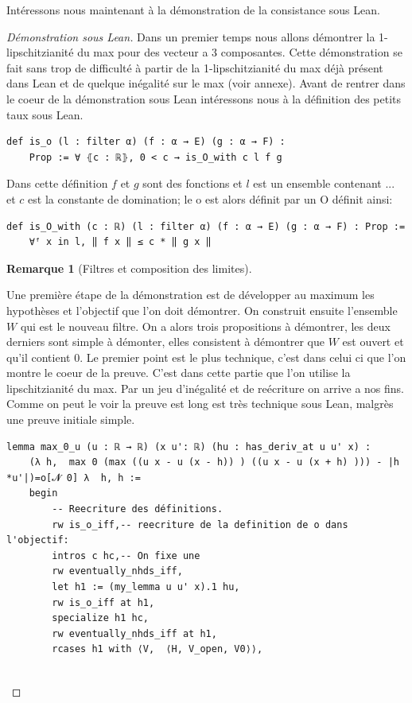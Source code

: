 \documentclass[12pt]{article}
\newtheorem{remark}[theorem]{Remarque}
\numberwithin{equation}{section}
\begin{document}
Intéressons nous maintenant à la démonstration de la consistance sous Lean.
\begin{proof}[Démonstration sous Lean]

Dans un premier temps nous allons démontrer la 1-lipschitzianité du max pour des vecteur a 3 composantes.
Cette démonstration se fait sans trop de difficulté à partir de la 1-lipschitzianité du max déjà présent dans Lean et de quelque inégalité sur le max (voir annexe).
Avant de rentrer dans le coeur de la démonstration sous Lean intéressons nous à la définition des petits taux sous Lean.
\begin{lstlisting}[gobble=2]
    def is_o (l : filter α) (f : α → E) (g : α → F) :
    Prop := ∀ ⦃c : ℝ⦄, 0 < c → is_O_with c l f g
\end{lstlisting}
Dans cette définition $f$ et $g$ sont des fonctions et $l$ est un ensemble contenant ... et $c$ est la constante de domination; le o est alors définit par un O définit ainsi:
\begin{lstlisting}[gobble=2]
    def is_O_with (c : ℝ) (l : filter α) (f : α → E) (g : α → F) : Prop :=
    ∀ᶠ x in l, ‖ f x ‖ ≤ c * ‖ g x ‖
\end{lstlisting}

\begin{remark}[Filtres et composition des limites]

\end{remark}

Une première étape de la démonstration est de développer au maximum les hypothèses et l'objectif que l'on doit démontrer.
On construit ensuite l'ensemble $W$ qui est le nouveau filtre. On a alors trois propositions à démontrer, les deux derniers sont simple à démonter, elles consistent à démontrer que $W$ est ouvert et qu'il contient $0$.
Le premier point est le plus technique, c'est dans celui ci que l'on montre le coeur de la preuve. C'est dans cette partie que l'on utilise la lipschitzianité du max. Par un jeu d'inégalité et de reécriture on arrive a nos fins.
Comme on peut le voir la preuve est long est très technique sous Lean, malgrès une preuve initiale simple.
\begin{lstlisting}[gobble=2]
    lemma max_0_u (u : ℝ → ℝ) (x u': ℝ) (hu : has_deriv_at u u' x) :
    (λ h,  max 0 (max ((u x - u (x - h)) ) ((u x - u (x + h) ))) - |h  *u'|)=o[𝓝 0] λ  h, h :=
    begin
        -- Reecriture des définitions.
        rw is_o_iff,-- reecriture de la definition de o dans l'objectif:
        intros c hc,-- On fixe une
        rw eventually_nhds_iff,
        let h1 := (my_lemma u u' x).1 hu,
        rw is_o_iff at h1,
        specialize h1 hc,
        rw eventually_nhds_iff at h1,
        rcases h1 with ⟨V,  ⟨H, V_open, V0⟩⟩,


\end{lstlisting}
\end{proof}
\end{document}
